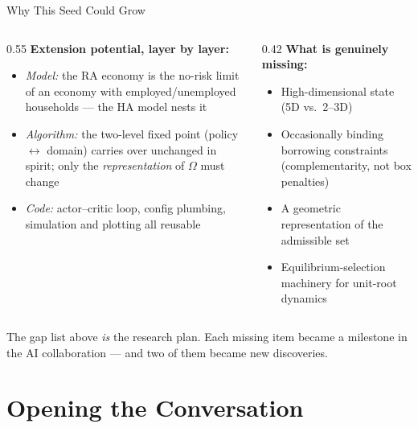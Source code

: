 \documentclass[10pt,aspectratio=169]{beamer}
\begin{document}
\begin{frame}{Why This Seed Could Grow}
\begin{columns}[T]
\begin{column}{0.55\textwidth}
\textbf{Extension potential, layer by layer:}
\begin{itemize}
    \item \emph{Model:} the RA economy is the no-risk limit of an economy with employed/unemployed
          households --- the HA model nests it
    \item \emph{Algorithm:} the two-level fixed point (policy $\leftrightarrow$ domain) carries over
          unchanged in spirit; only the \emph{representation} of $\Omega$ must change
    \item \emph{Code:} actor--critic loop, config plumbing, simulation and plotting all reusable
\end{itemize}
\end{column}
\begin{column}{0.42\textwidth}
\textbf{What is genuinely missing:}
\begin{itemize}
    \item High-dimensional state (5D vs.\ 2--3D)
    \item Occasionally binding borrowing constraints (complementarity, not box penalties)
    \item A geometric representation of the admissible set
    \item Equilibrium-selection machinery for unit-root dynamics
\end{itemize}
\end{column}
\end{columns}

\medskip
\begin{block}{}
The gap list above \emph{is} the research plan. Each missing item became a milestone
in the AI collaboration --- and two of them became new discoveries.
\end{block}
\end{frame}

\section{Opening the Conversation}
\end{document}

